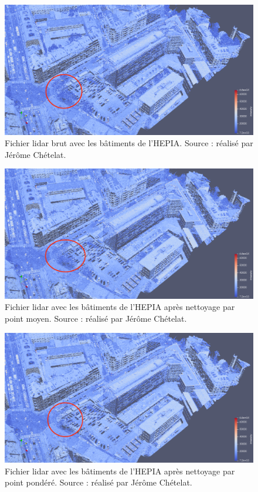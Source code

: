 \begin{figure}[htbp!]
    \centering
	\includegraphics[width=0.9\linewidth]{figures/filters/hepia_las.png}
	\caption{Fichier lidar brut avec les bâtiments de l'HEPIA. Source : réalisé par Jérôme Chételat.}
	\label{fig:lidar_bef_filt}
\end{figure}

\begin{figure}[htbp!]
    \centering
	\includegraphics[width=0.9\linewidth]{figures/filters/hepia_filtered_avg_las.png}
	\caption{Fichier lidar avec les bâtiments de l'HEPIA après nettoyage par point moyen. Source : réalisé par Jérôme Chételat.}
	\label{fig:lidar_aft_filt_avg}
\end{figure}

\begin{figure}[htbp!]
    \centering
	\includegraphics[width=0.9\linewidth]{figures/filters/hepia_filtered_pond_las.png}
	\caption{Fichier lidar avec les bâtiments de l'HEPIA après nettoyage par point pondéré. Source : réalisé par Jérôme Chételat.}
	\label{fig:lidar_aft_filt_pond}
\end{figure}

